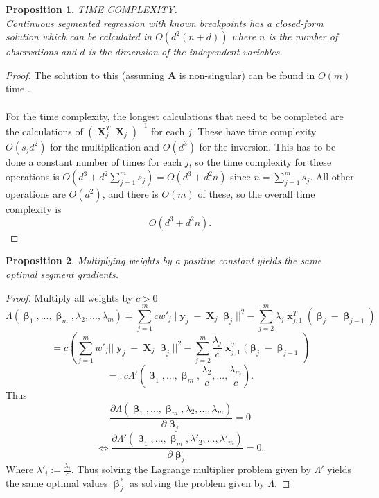 \documentclass[12pt]{article}
\DeclareMathOperator{\bx}{\textbf{x}}
\DeclareMathOperator{\bX}{\textbf{X}}
\DeclareMathOperator{\by}{\textbf{y}}
\DeclareMathOperator{\bbeta}{\boldsymbol{\beta}}
\newtheorem{prop}{Proposition}
\begin{document}
\begin{prop}
TIME COMPLEXITY. \\
Continuous segmented regression with known breakpoints has a closed-form solution which can be calculated in $O(d^2(n+d))$ where $n$ is the number of observations and $d$ is the dimension of the independent variables.
\end{prop}
\begin{proof}
The solution to this (assuming $\mathbf{A}$ is non-singular) can be found in $O(m)$ time \cite{tridiagonal}. \\ \\
For the time complexity, the longest calculations that need to be completed are the calculations of $(\bX_j^T\bX_j)^{-1}$ for each $j$. These have time complexity $O(s_jd^2)$ for the multiplication and $O(d^3)$ for the inversion. This has to be done a constant number of times for each $j$, so the time complexity for these operations is $O(d^3+d^2\sum_{j=1}^ms_j) = O(d^3+d^2n)$ since $n=\sum_{j=1}^m s_j$. All other operations are $O(d^2)$, and there is $O(m)$ of these, so the overall time complexity is 
$$O(d^3+d^2n).$$
\end{proof}

\begin{prop}
Multiplying weights by a positive constant yields the same optimal segment gradients.
\end{prop}
\begin{proof}
Multiply all weights by $c>0$
$$\Lambda(\bbeta_1,...,\bbeta_m,\lambda_2,...,\lambda_m) =  \sum_{j=1}^m cw'_j||\by_j-\bX_j\bbeta_j||^2-\sum_{j=2}^m\lambda_j\bx_{j, 1}^T (\bbeta_j - \bbeta_{j-1})$$
$$=c\left(\sum_{j=1}^m w'_j||\by_j-\bX_j\bbeta_j||^2-\sum_{j=2}^m\frac{\lambda_j}{c}\bx_{j, 1}^T (\bbeta_j - \bbeta_{j-1} \right)$$
$$=:c\Lambda' \left(\bbeta_1,...,\bbeta_m,\frac{\lambda_2}{c},...,\frac{\lambda_m}{c}\right).$$
Thus 
$$\frac{\partial \Lambda(\bbeta_1,...,\bbeta_m,\lambda_2,...,\lambda_m)}{\partial \bbeta_j} = 0$$
$$\iff \frac{\partial \Lambda' \left(\bbeta_1,...,\bbeta_m,\lambda'_2,...,\lambda'_m \right)}{\partial \bbeta_j}=0.$$
Where $\lambda'_i := \frac{\lambda_i}{c}$.
Thus solving the Lagrange multiplier problem given by $\Lambda'$ yields the same optimal values $\bbeta^*_j$ as solving the problem given by $\Lambda$.
\end{proof}
\end{document}
